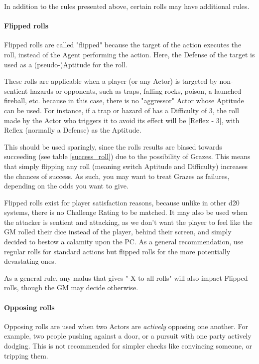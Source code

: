 In addition to the rules presented above, certain rolls may have additional rules.


\paragraph{Flipped rolls} 

Flipped rolls are called "flipped" because the target of the action executes the roll, instead of the Agent performing the action. Here, the Defense of the target is used as a (pseudo-)Aptitude for the roll.

These rolls are applicable when a player (or any Actor) is targeted by non-sentient hazards or opponents, such as traps, falling rocks, poison, a launched fireball, etc. because in this case, there is no "aggressor" Actor whose Aptitude can be used. For instance, if a trap or hazard of has a Difficulty of 3, the roll made by the Actor who triggers it to avoid its effect will be [Reflex - 3], with Reflex (normally a Defense) as the Aptitude.

This should be used sparingly, since the rolls results are biased towards succeeding (see table \ref{success_roll}) due to the possibility of Grazes. This means that simply flipping any roll (meaning switch Aptitude and Difficulty) increases the chances of success. As such, you may want to treat Grazes as failures, depending on the odds you want to give. 

Flipped rolls exist for player satisfaction reasons, because unlike in other d20 systems, there is no Challenge Rating to be matched. It may also be used when the attacker is sentient and attacking, as we don't want the player to feel like the GM rolled their dice instead of the player, behind their screen, and simply decided to bestow a calamity upon the PC. As a general recommendation, use regular rolls for standard actions but flipped rolls for the more potentially devastating ones.

As a general rule, any malus that gives "-X to all rolls" will also impact Flipped rolls, though the GM may decide otherwise.


\paragraph{Opposing rolls} 

Opposing rolls are used when two Actors are \textit{actively} opposing one another. For example, two people pushing against a door, or a pursuit with one party actively dodging. This is not recommended for simpler checks like convincing someone, or tripping them.

